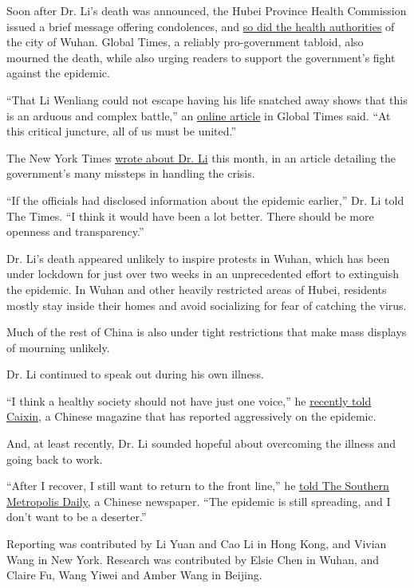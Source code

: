Soon after Dr. Li's death was announced, the Hubei Province Health
Commission issued a brief message offering condolences, and
\href{http://wjw.wuhan.gov.cn/front/web/showDetail/2020020709438}{so did
the health authorities} of the city of Wuhan. Global Times, a reliably
pro-government tabloid, also mourned the death, while also urging
readers to support the government's fight against the epidemic.

``That Li Wenliang could not escape having his life snatched away shows
that this is an arduous and complex battle,'' an
\href{https://baijiahao.baidu.com/s?id=1657823085627418251\&wfr=spider\&for=pc}{online
article} in Global Times said. ``At this critical juncture, all of us
must be united.''

The New York Times
\href{https://www.nytimes3xbfgragh.onion/2020/02/01/world/asia/china-coronavirus.html}{wrote
about Dr. Li} this month, in an article detailing the government's many
missteps in handling the crisis.

``If the officials had disclosed information about the epidemic
earlier,'' Dr. Li told The Times. ``I think it would have been a lot
better. There should be more openness and transparency.''

Dr. Li's death appeared unlikely to inspire protests in Wuhan, which has
been under lockdown for just over two weeks in an unprecedented effort
to extinguish the epidemic. In Wuhan and other heavily restricted areas
of Hubei, residents mostly stay inside their homes and avoid socializing
for fear of catching the virus.

Much of the rest of China is also under tight restrictions that make
mass displays of mourning unlikely.

Dr. Li continued to speak out during his own illness.

``I think a healthy society should not have just one voice,'' he
\href{http://china.caixin.com/2020-02-06/101509761.html}{recently told
Caixin}, a Chinese magazine that has reported aggressively on the
epidemic.

And, at least recently, Dr. Li sounded hopeful about overcoming the
illness and going back to work.

``After I recover, I still want to return to the front line,'' he
\href{http://m.mp.oeeee.com/a/BAAFRD000020200206259581.html}{told The
Southern Metropolis Daily}, a Chinese newspaper. ``The epidemic is still
spreading, and I don't want to be a deserter.''

Reporting was contributed by Li Yuan and Cao Li in Hong Kong, and Vivian
Wang in New York. Research was contributed by Elsie Chen in Wuhan, and
Claire Fu, Wang Yiwei and Amber Wang in Beijing.

